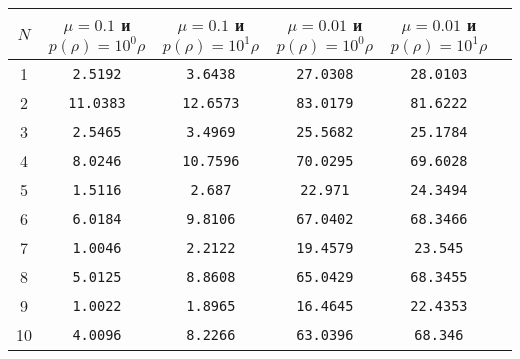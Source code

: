 \begin{table}[H]
\centering
\begin{tabular}{|c|c|c|c|c|c|}
\hline
$N$ & $\mu = 0.1$ и $ p(\rho) = 10^0\rho$ & $\mu = 0.1$ и $ p(\rho) = 10^1\rho$ & $\mu = 0.01$ и $ p(\rho) = 10^0\rho$ & $\mu = 0.01$ и $ p(\rho) = 10^1\rho$ \\
\hline
1 & \texttt{2.5192} & \texttt{3.6438} & \texttt{27.0308} & \texttt{28.0103} \\
\hline
2 & \texttt{11.0383} & \texttt{12.6573} & \texttt{83.0179} & \texttt{81.6222} \\
\hline
3 & \texttt{2.5465} & \texttt{3.4969} & \texttt{25.5682} & \texttt{25.1784} \\
\hline
4 & \texttt{8.0246} & \texttt{10.7596} & \texttt{70.0295} & \texttt{69.6028} \\
\hline
5 & \texttt{1.5116} & \texttt{2.687} & \texttt{22.971} & \texttt{24.3494} \\
\hline
6 & \texttt{6.0184} & \texttt{9.8106} & \texttt{67.0402} & \texttt{68.3466} \\
\hline
7 & \texttt{1.0046} & \texttt{2.2122} & \texttt{19.4579} & \texttt{23.545} \\
\hline
8 & \texttt{5.0125} & \texttt{8.8608} & \texttt{65.0429} & \texttt{68.3455} \\
\hline
9 & \texttt{1.0022} & \texttt{1.8965} & \texttt{16.4645} & \texttt{22.4353} \\
\hline
10 & \texttt{4.0096} & \texttt{8.2266} & \texttt{63.0396} & \texttt{68.346} \\
\hline
\end{tabular}
\end{table}


